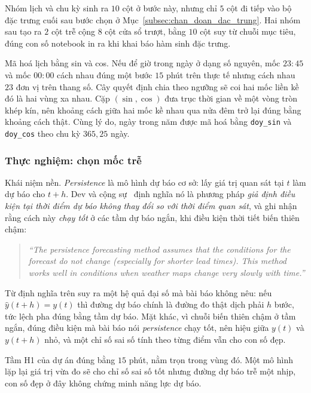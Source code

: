 \documentclass[12pt, a4paper]{report}
\begin{document}
Nhóm lịch và chu kỳ sinh ra $10$ cột ở bước này, nhưng chỉ $5$ cột đi tiếp vào bộ đặc trưng
cuối sau bước chọn ở Mục~\ref{subsec:chan_doan_dac_trung}. Hai nhóm sau tạo ra $2$ cột trễ cộng
$8$ cột cửa sổ trượt, bằng $10$ cột suy từ chuỗi mục
tiêu, đúng con số notebook in ra khi khai báo hàm sinh đặc trưng.

Mã hoá lịch bằng sin và cos. Nếu để giờ trong ngày ở dạng số nguyên, mốc $23{:}45$
và mốc $00{:}00$ cách nhau đúng một bước $15$ phút trên thực tế nhưng cách nhau $23$ đơn vị
trên thang số. Cây quyết định chia theo ngưỡng sẽ coi hai mốc liền kề đó là hai vùng xa
nhau. Cặp $(\sin, \cos)$ đưa trục thời gian về một vòng tròn khép kín, nên khoảng cách giữa
hai mốc kề nhau qua nửa đêm trở lại đúng bằng khoảng cách thật. Cùng lý do, ngày trong năm
được mã hoá bằng \texttt{doy\_sin} và \texttt{doy\_cos} theo chu kỳ $365{,}25$ ngày.

\subsubsection{Thực nghiệm: chọn mốc trễ}

Khái niệm nền. \textit{Persistence} là mô hình dự báo cơ sở: lấy giá trị quan sát
tại $t$ làm dự báo cho $t+h$. Dev và cộng sự~\cite{dev2018tes} định nghĩa nó là phương pháp
\textit{giả định điều kiện tại thời điểm dự báo không thay đổi so với thời điểm quan sát},
và ghi nhận rằng cách này \textit{chạy tốt} ở các tầm dự báo ngắn, khi điều kiện thời tiết
biến thiên chậm:

\begin{quote}\small
\textit{``The persistence forecasting method assumes that the conditions for the forecast do not change (especially for shorter lead times). This method works well in conditions when weather maps change very slowly with time.''}
\end{quote}


Từ định nghĩa trên suy ra một hệ quả đại số mà bài báo không nêu: nếu $\hat{y}(t+h) = y(t)$
thì đường dự báo chính là đường đo thật dịch phải $h$ bước, tức lệch pha đúng bằng
tầm dự báo. Mặt khác, vì chuỗi biến thiên chậm ở tầm ngắn, đúng điều kiện mà bài báo nói
\textit{persistence} chạy tốt, nên hiệu giữa $y(t)$ và $y(t+h)$ nhỏ, và một chỉ số sai số
tính theo từng điểm vẫn cho con số đẹp.

Tầm H1 của dự án đúng bằng $15$ phút, nằm trọn trong vùng đó. Một mô hình lặp lại giá trị vừa
đo sẽ cho chỉ số sai số tốt nhưng đường dự báo trễ một nhịp, con số đẹp
ở đây không chứng minh năng lực dự báo.
\end{document}
